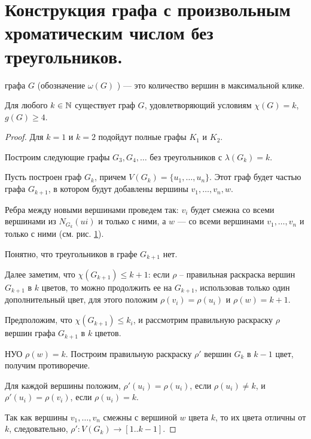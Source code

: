 \section{Конструкция графа с произвольным хроматическим числом без треугольников.}
\begin{definition}
     графа $G$ (обозначение $\omega(G)$ ) --- это количество вершин в максимальной клике.
\end{definition}

\begin{theorem}[Мычельский, 1955]
	Для любого $ k \in \mathbb{N}$ существует граф $G$, удовлетворяющий условиям $\chi(G) = k$, $g(G) \ge 4$.
\end{theorem}
\begin{proof}
	Для $k=1$ и $k=2$  подойдут полные графы $K_1$ и $K_2$.

	Построим следующие графы $G_3, G_4 , \ldots $ без треугольников с $\lambda(G_k) = k$.

	Пусть построен граф $G_k$, причем $V(G_k) = \{u_1, \ldots  ,u_n \}$.
	Этот граф будет частью графа $G_{k+1}$, в котором будут добавлены вершины $v_1 , \ldots  , v_n , w$. 

	Ребра между новыми вершинами проведем так: $v_i$ будет смежна со всеми вершинами из $N_{G_k}(ui)$ и только с ними, а $w$ --- со всеми вершинами $v_1 , \ldots  , v_n$ и только с ними (см. рис. \ref{}). 
	\begin{figure}[ht]
		\centering
		\caption{}
		\label{fig:mycielski-theorem}
	\end{figure}

	Понятно, что треугольников в графе $G_{k+1}$ нет. 

	Далее заметим, что $\chi(G_{k+1}) \le  k + 1$: если $\rho$ -- правильная раскраска вершин $G_{k+1}$ в $k$ цветов, то можно продолжить ее на $G_{k+1}$, использовав только один дополнительный цвет, для этого положим $\rho(v_i) = \rho(u_i)$ и $\rho(w)  = k+1$.

	Предположим, что $\chi(G_{k+1}) \le k_i$, и рассмотрим правильную раскраску $\rho$ вершин графа $G_{k+1}$ в $k$ цветов.

	НУО $\rho(w) = k$. Построим правильную раскраску $\rho'$ вершин $G_k$ в $k-1$ цвет, получим противоречие.

	 Для каждой вершины положим, $\rho' (u_i) = \rho(u_i)$, если $\rho(u_i) \neq k$, и $\rho'(u_i) = \rho(v_i)$, если $\rho(u_i) = k$. 

	 Так как вершины $v_1, \ldots , v_n$ смежны с вершиной $w$ цвета $k$, то их цвета отличны от $k$, следовательно, $\rho'\colon V(G_k) \to [1..k-1]$. 


\end{proof}

